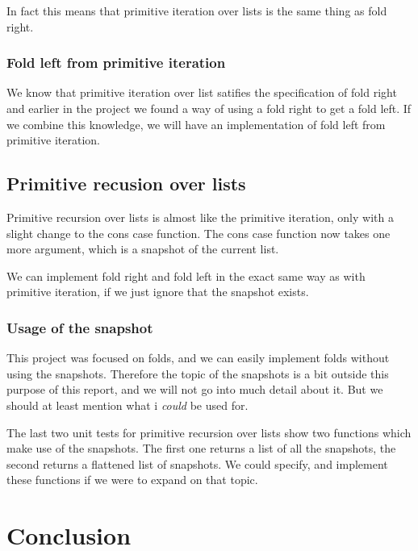 \documentclass[a4paper]{article}
\begin{document}
In fact this means that primitive iteration over lists is the same thing as fold
right.

\subsubsection{Fold left from primitive iteration}
We know that primitive iteration over list satifies the specification of fold
right and earlier in the project we found a way of using a fold right to get a fold
left. If we combine this knowledge, we will have an implementation of fold left
from primitive iteration.

\subsection{Primitive recusion over lists}
Primitive recursion over lists is almost like the primitive iteration, only with
a slight change to the cons case function. The cons case function now takes one
more argument, which is a snapshot of the current list.

We can implement fold right and fold left in the exact same way as with
primitive iteration, if we just ignore that the snapshot exists.

\subsubsection{Usage of the snapshot}
This project was focused on folds, and we can easily implement folds without
using the snapshots. Therefore the topic of the snapshots is a bit outside this
purpose of this report, and we will not go into much detail about it. But we
should at least mention what i \emph{could} be used for.

The last two unit tests for primitive recursion over lists show two functions
which make use of the snapshots. The first one returns a list of all the
snapshots, the second returns a flattened list of snapshots. We could specify,
and implement these functions if we were to expand on that topic.

\section{Conclusion}
\end{document}
